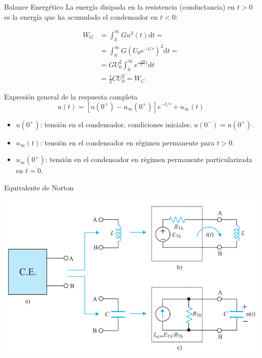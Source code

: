\documentclass[aspectratio=169, usenames,svgnames,dvipsnames]{beamer}
\begin{document}
\begin{frame}[label={sec:org52c8377}]{Balance Energético}
La energía disipada en la resistencia (conductancia) en \(t > 0\) es la energía que ha acumulado el condensador en \(t < 0\):

\begin{align*}
  W_G &= \int_0^\infty G u^2(t)  \mathrm{d}t =\\
  &= \int_0^\infty G (U_0 e^{-t/\tau})^2  \mathrm{d}t = \\
  & = G U_0^2 \int_0^\infty e^{\frac{-2R}{C}t}  \mathrm{d}t\\
  &= \frac{1}{2} C U_0^2 = W_C  
\end{align*}
\end{frame}

\begin{frame}[label={sec:orgda24cfe}]{Expresión general de la respuesta completa}
\[
\boxed{u(t) = \left[u(0^+) - u_\infty(0^+)\right] e^{-t/\tau} + u_\infty(t)}
\]

\begin{itemize}
\item \(u(0^+)\): tensión en el condensador, condiciones iniciales, \(u(0^-) = u(0^+)\).
\item \(u_\infty(t)\): tensión en el condensador en régimen permanente para \(t > 0\).
\item \(u_\infty(0^+)\): tensión en el condensador en régimen permanente particularizada en \(t = 0\).
\end{itemize}
\end{frame}

\begin{frame}[label={sec:org37c0e0b}]{Equivalente de Norton}
\begin{center}
\includegraphics[height=0.85\textheight]{../figs/Thevenin_PrimerOrden.pdf}
\end{center}
\end{frame}
\end{document}
